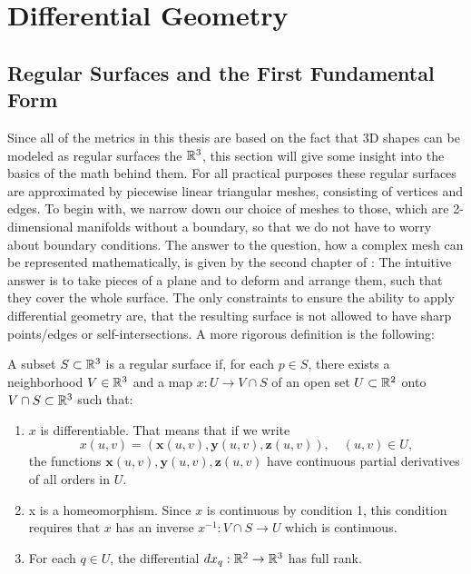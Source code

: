 \chapter{Differential Geometry}
\label{chapter:differentialGeometry}

\section{Regular Surfaces and the First Fundamental Form}
Since all of the metrics in this thesis are based on the fact that 3D shapes can be modeled as regular surfaces the $\mathbb{R}^3$, this section will give some insight into the basics of the math behind them.
For all practical purposes these regular surfaces are approximated by piecewise linear triangular meshes, consisting of vertices and edges.
To begin with, we narrow down our choice of meshes to those, which are 2-dimensional manifolds without a boundary, so that we do not have to worry about boundary conditions.
The answer to the question, how a complex mesh can be represented mathematically, is given by the second chapter of \cite{do1976differential}:
The intuitive answer is to take pieces of a plane and to deform and arrange them, such that they cover the whole surface.
The only constraints to ensure the ability to apply differential geometry are, that the resulting surface is not allowed to have sharp points/edges or self-intersections.
A more rigorous definition is the following:
\begin{mydef}
	A subset $S \subset \mathbb{R}^3$ is a regular surface if, for each $p \in S$, there exists a neighborhood $V \in \mathbb{R}^3$ and a map $x:U \rightarrow V \cap S$ of an open set $U \subset \mathbb{R}^2$ onto $V \cap S \subset \mathbb{R}^3$ such that:
	\begin{enumerate}
		\item $x$ is differentiable. That means that if we write
			$$x(u,v) = (\mathbf{x}(u,v), \mathbf{y}(u,v), \mathbf{z}(u,v)), \quad (u,v) \in U,$$
			the functions $\mathbf{x}(u,v), \mathbf{y}(u,v), \mathbf{z}(u,v)$ have continuous partial derivatives of all orders in $U$.
		\item x is a homeomorphism. Since $x$ is continuous by condition 1, this condition requires that $x$ has an inverse $x^{-1}: V \cap S \rightarrow U$ which is continuous.
		\item For each $q \in U$, the differential $dx_q: \mathbb{R}^2 \rightarrow \mathbb{R}^3$ has full rank.
	\end{enumerate}
\end{mydef}
